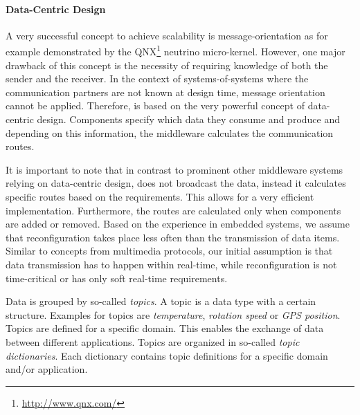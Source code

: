 \paragraph{Data-Centric Design}
A very successful concept to achieve scalability is message-orientation as for example demonstrated by the QNX\footnote{\url{http://www.qnx.com/}} neutrino micro-kernel.
However, one major drawback of this concept is the necessity of requiring knowledge of both the sender and the receiver.
In the context of systems-of-systems where the communication partners are not known at design time, message orientation cannot be applied.
Therefore, \xme is based on the very powerful concept of data-centric design. Components specify which data they consume
and produce and depending on this information, the middleware calculates the communication routes.

It is important to note that in contrast to prominent other middleware systems relying on data-centric design,
\xme does not broadcast the data, instead it calculates specific routes based on the requirements.
This allows for a very efficient implementation. Furthermore, the routes are calculated only when components are added or removed. Based
on the experience in embedded systems, we assume that reconfiguration takes place less often than the transmission of data items.
Similar to concepts from multimedia protocols,
our initial assumption is that data transmission has to happen within real-time,
while reconfiguration is not time-critical or has only soft real-time requirements.

Data is grouped by so-called \emph{topics}. A topic is a data type with a certain structure.
Examples for topics are \emph{temperature}, \emph{rotation speed} or \emph{GPS position}. Topics are defined for a specific domain.
This enables the exchange of data between different applications.
%
Topics are organized in so-called \emph{topic dictionaries}.
Each dictionary contains topic definitions for a specific domain and/or application.

